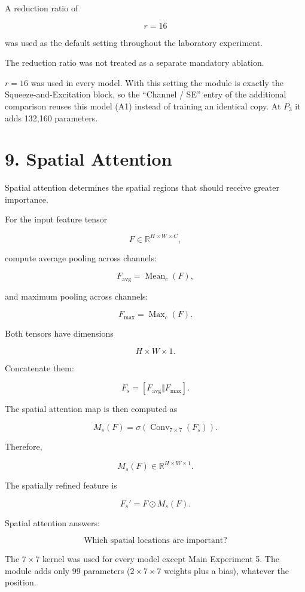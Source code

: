 \documentclass[10pt]{article}
\begin{document}
A reduction ratio of

\[
r=16
\]

was used as the default setting throughout the laboratory experiment.

The reduction ratio was not treated as a separate mandatory ablation.

$r=16$ was used in every model. With this setting the module is exactly the
Squeeze-and-Excitation block, so the ``Channel / SE'' entry of the additional
comparison reuses this model (A1) instead of training an identical copy. At
$P_3$ it adds 132{,}160 parameters.

\section*{9. Spatial Attention}

Spatial attention determines the spatial regions that should receive greater
importance.

For the input feature tensor

\[
F\in\mathbb{R}^{H\times W\times C},
\]

compute average pooling across channels:

\[
F_{\mathrm{avg}}
=
\operatorname{Mean}_{c}(F),
\]

and maximum pooling across channels:

\[
F_{\mathrm{max}}
=
\operatorname{Max}_{c}(F).
\]

Both tensors have dimensions

\[
H\times W\times1.
\]

Concatenate them:

\[
F_s
=
[
F_{\mathrm{avg}}
\Vert
F_{\mathrm{max}}
].
\]

The spatial attention map is then computed as

\[
M_s(F)
=
\sigma
\left(
\operatorname{Conv}_{7\times7}(F_s)
\right).
\]

Therefore,

\[
M_s(F)
\in
\mathbb{R}^{H\times W\times1}.
\]

The spatially refined feature is

\[
F_s'
=
F\odot M_s(F).
\]

Spatial attention answers:

\[
\boxed{\text{Which spatial locations are important?}}
\]

The $7\times7$ kernel was used for every model except Main Experiment 5. The
module adds only 99 parameters ($2\times7\times7$ weights plus a bias),
whatever the position.
\end{document}

